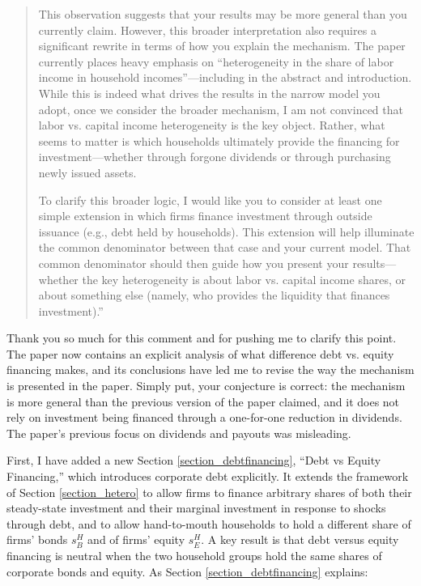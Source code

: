 \documentclass[11pt]{article}
\begin{document}
\begin{enumerate}
\begin{quote}
This observation suggests that your results may be more general than you currently claim. However, this broader interpretation also requires a significant rewrite in terms of how you explain the mechanism. The paper currently places heavy emphasis on ``heterogeneity in the share of labor income in household incomes''---including in the abstract and introduction. While this is indeed what drives the results in the narrow model you adopt, once we consider the broader mechanism, I am not convinced that labor vs. capital income heterogeneity is the key object. Rather, what seems to matter is which households ultimately provide the financing for investment---whether through forgone dividends or through purchasing newly issued assets.

To clarify this broader logic, I would like you to consider at least one simple extension in which firms finance investment through outside issuance (e.g., debt held by households). This extension will help illuminate the common denominator between that case and your current model. That common denominator should then guide how you present your results---whether the key heterogeneity is about labor vs. capital income shares, or about something else (namely, who provides the liquidity that finances investment).''
\end{quote}

Thank you so much for this comment and for pushing me to clarify this point. The paper now contains an explicit analysis of what difference debt vs. equity financing makes, and its conclusions have led me to revise the way the mechanism is presented in the paper. Simply put, your conjecture is correct: the mechanism is more general than the previous version of the paper claimed, and it does not rely on investment being financed through a one-for-one reduction in dividends. The paper's previous focus on dividends and payouts was misleading.

First, I have added a new Section \ref{section_debtfinancing}, ``Debt vs Equity Financing,'' which introduces corporate debt explicitly. It extends the framework of Section \ref{section_hetero} to allow firms to finance arbitrary shares of both their steady-state investment and their marginal investment in response to shocks through debt, and to allow hand-to-mouth households to hold a different share of firms' bonds $s_B^H$ and of firms' equity $s_E^H$. A key result is that debt versus equity financing is neutral when the two household groups hold the same shares of corporate bonds and equity. As Section \ref{section_debtfinancing} explains:


\end{enumerate}
\end{document}

